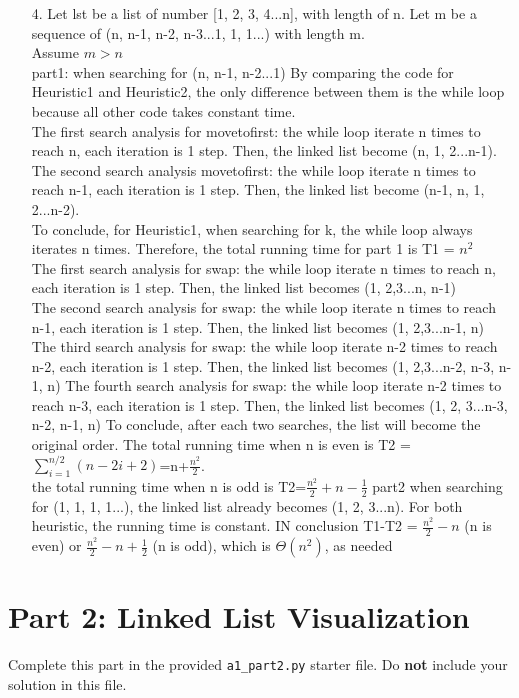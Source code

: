 \documentclass[fontsize=11pt]{article}
\begin{document}
\begin{enumerate}
        \item[4.]
        Let lst be a list of number [1, 2, 3, 4...n], with length of n.
        Let m be a sequence of (n, n-1, n-2, n-3...1, 1, 1...) with length m.\\
        Assume $m>n$\\
        part1: when searching for (n, n-1, n-2...1)
        By comparing the code for Heuristic1 and Heuristic2, the only difference between them is the while loop because all other code takes constant time.\\
        The first search analysis for movetofirst: the while loop iterate n times to reach n, each iteration is 1 step. Then, the linked list become (n, 1, 2...n-1).\\
        The second search analysis movetofirst: the while loop iterate n times to reach n-1, each iteration is 1 step. Then, the linked list become (n-1, n, 1, 2...n-2).\\
        To conclude, for Heuristic1, when searching for k, the while loop always iterates n times. Therefore, the total running time for part 1 is T1 = $n^2$\\
        The first search analysis for swap: the while loop iterate n times to reach n, each iteration is 1 step. Then, the linked list becomes (1, 2,3...n, n-1)\\
        The second search analysis for swap: the while loop iterate n times to reach n-1, each iteration is 1 step. Then, the linked list becomes (1, 2,3...n-1, n)
        The third search analysis for swap: the while loop iterate n-2 times to reach n-2, each iteration is 1 step. Then, the linked list becomes (1, 2,3...n-2, n-3, n-1, n)
        The fourth search analysis for swap: the while loop iterate n-2 times to reach n-3, each iteration is 1 step. Then, the linked list becomes (1, 2, 3...n-3, n-2, n-1, n)
        To conclude, after each two searches, the list will become the original order. The total running time when n is even is T2 = $\sum_{i=1}^{n/2}(n-2i+2)$=n+$\frac{n^{2}}{2}$.\\
        the total running time when n is odd is T2=$\frac{n^2}{2}+n-\frac{1}{2}$
        part2 when searching for (1, 1, 1, 1...), the linked list already becomes (1, 2, 3...n). For both heuristic, the running time is constant.
        IN conclusion T1-T2 = $\frac{n^2}{2}-n$ (n is even) or $\frac{n^2}{2}-n+\frac{1}{2}$ (n is odd), which is $\Theta(n^2)$, as needed
    \end{enumerate}

    \section*{Part 2: Linked List Visualization}
    Complete this part in the provided \texttt{a1\_part2.py} starter file.
    Do \textbf{not} include your solution in this file.
\end{document}
